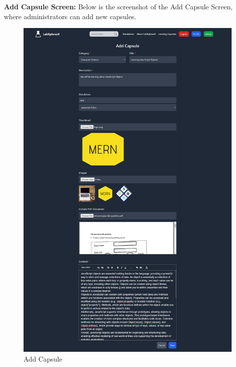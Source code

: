 \textbf{Add Capsule Screen:} Below is the screenshot of the Add Capsule Screen, where administrators can add new capsules.
\begin{figure}[H]
    \centering
    \includegraphics[width = 14cm]{Diagrams/output/addcapsule.png}
    \caption{Add Capsule}
\end{figure}

